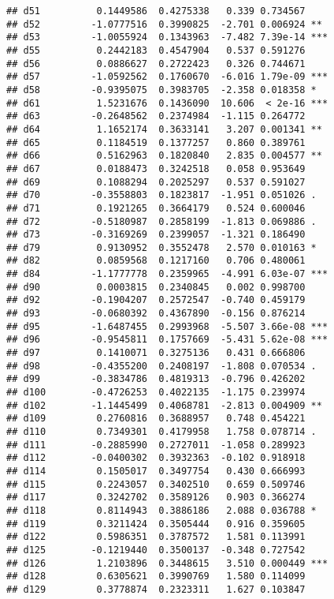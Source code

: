 \documentclass[
]{article}
\begin{document}
\begin{verbatim}
## d51          0.1449586  0.4275338   0.339 0.734567    
## d52         -1.0777516  0.3990825  -2.701 0.006924 ** 
## d53         -1.0055924  0.1343963  -7.482 7.39e-14 ***
## d55          0.2442183  0.4547904   0.537 0.591276    
## d56          0.0886627  0.2722423   0.326 0.744671    
## d57         -1.0592562  0.1760670  -6.016 1.79e-09 ***
## d58         -0.9395075  0.3983705  -2.358 0.018358 *  
## d61          1.5231676  0.1436090  10.606  < 2e-16 ***
## d63         -0.2648562  0.2374984  -1.115 0.264772    
## d64          1.1652174  0.3633141   3.207 0.001341 ** 
## d65          0.1184519  0.1377257   0.860 0.389761    
## d66          0.5162963  0.1820840   2.835 0.004577 ** 
## d67          0.0188473  0.3242518   0.058 0.953649    
## d69          0.1088294  0.2025297   0.537 0.591027    
## d70         -0.3558803  0.1823817  -1.951 0.051026 .  
## d71          0.1921265  0.3664179   0.524 0.600046    
## d72         -0.5180987  0.2858199  -1.813 0.069886 .  
## d73         -0.3169269  0.2399057  -1.321 0.186490    
## d79          0.9130952  0.3552478   2.570 0.010163 *  
## d82          0.0859568  0.1217160   0.706 0.480061    
## d84         -1.1777778  0.2359965  -4.991 6.03e-07 ***
## d90          0.0003815  0.2340845   0.002 0.998700    
## d92         -0.1904207  0.2572547  -0.740 0.459179    
## d93         -0.0680392  0.4367890  -0.156 0.876214    
## d95         -1.6487455  0.2993968  -5.507 3.66e-08 ***
## d96         -0.9545811  0.1757669  -5.431 5.62e-08 ***
## d97          0.1410071  0.3275136   0.431 0.666806    
## d98         -0.4355200  0.2408197  -1.808 0.070534 .  
## d99         -0.3834786  0.4819313  -0.796 0.426202    
## d100        -0.4726253  0.4022135  -1.175 0.239974    
## d102        -1.1445499  0.4068781  -2.813 0.004909 ** 
## d109         0.2760816  0.3688957   0.748 0.454221    
## d110         0.7349301  0.4179958   1.758 0.078714 .  
## d111        -0.2885990  0.2727011  -1.058 0.289923    
## d112        -0.0400302  0.3932363  -0.102 0.918918    
## d114         0.1505017  0.3497754   0.430 0.666993    
## d115         0.2243057  0.3402510   0.659 0.509746    
## d117         0.3242702  0.3589126   0.903 0.366274    
## d118         0.8114943  0.3886186   2.088 0.036788 *  
## d119         0.3211424  0.3505444   0.916 0.359605    
## d122         0.5986351  0.3787572   1.581 0.113991    
## d125        -0.1219440  0.3500137  -0.348 0.727542    
## d126         1.2103896  0.3448615   3.510 0.000449 ***
## d128         0.6305621  0.3990769   1.580 0.114099    
## d129         0.3778874  0.2323311   1.627 0.103847    

\end{verbatim}
\end{document}
